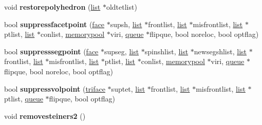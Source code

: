 \begin{DoxyCompactItemize}
\item 
\hypertarget{classtetgenmesh_a0a7e16c5453d7c0580cbf96cc32dc38c}{void {\bfseries restorepolyhedron} (\hyperlink{classtetgenmesh_1_1list}{list} $\ast$oldtetlist)}\label{classtetgenmesh_a0a7e16c5453d7c0580cbf96cc32dc38c}

\item 
\hypertarget{classtetgenmesh_a4c252991d3562d8c665f33437851b4d4}{bool {\bfseries suppressfacetpoint} (\hyperlink{classtetgenmesh_1_1face}{face} $\ast$supsh, \hyperlink{classtetgenmesh_1_1list}{list} $\ast$frontlist, \hyperlink{classtetgenmesh_1_1list}{list} $\ast$misfrontlist, \hyperlink{classtetgenmesh_1_1list}{list} $\ast$ptlist, \hyperlink{classtetgenmesh_1_1list}{list} $\ast$conlist, \hyperlink{classtetgenmesh_1_1memorypool}{memorypool} $\ast$viri, \hyperlink{classtetgenmesh_1_1queue}{queue} $\ast$flipque, bool noreloc, bool optflag)}\label{classtetgenmesh_a4c252991d3562d8c665f33437851b4d4}

\item 
\hypertarget{classtetgenmesh_a52229bb0921ccee9310c5dd201b37a00}{bool {\bfseries suppresssegpoint} (\hyperlink{classtetgenmesh_1_1face}{face} $\ast$supseg, \hyperlink{classtetgenmesh_1_1list}{list} $\ast$spinshlist, \hyperlink{classtetgenmesh_1_1list}{list} $\ast$newsegshlist, \hyperlink{classtetgenmesh_1_1list}{list} $\ast$frontlist, \hyperlink{classtetgenmesh_1_1list}{list} $\ast$misfrontlist, \hyperlink{classtetgenmesh_1_1list}{list} $\ast$ptlist, \hyperlink{classtetgenmesh_1_1list}{list} $\ast$conlist, \hyperlink{classtetgenmesh_1_1memorypool}{memorypool} $\ast$viri, \hyperlink{classtetgenmesh_1_1queue}{queue} $\ast$flipque, bool noreloc, bool optflag)}\label{classtetgenmesh_a52229bb0921ccee9310c5dd201b37a00}

\item 
\hypertarget{classtetgenmesh_ab3b4e7a3564b02cf6006d2703581ca95}{bool {\bfseries suppressvolpoint} (\hyperlink{classtetgenmesh_1_1triface}{triface} $\ast$suptet, \hyperlink{classtetgenmesh_1_1list}{list} $\ast$frontlist, \hyperlink{classtetgenmesh_1_1list}{list} $\ast$misfrontlist, \hyperlink{classtetgenmesh_1_1list}{list} $\ast$ptlist, \hyperlink{classtetgenmesh_1_1queue}{queue} $\ast$flipque, bool optflag)}\label{classtetgenmesh_ab3b4e7a3564b02cf6006d2703581ca95}

\item 
\hypertarget{classtetgenmesh_a1c855422877dbf8867cce374439baa5b}{void {\bfseries removesteiners2} ()}\label{classtetgenmesh_a1c855422877dbf8867cce374439baa5b}


\end{DoxyCompactItemize}
